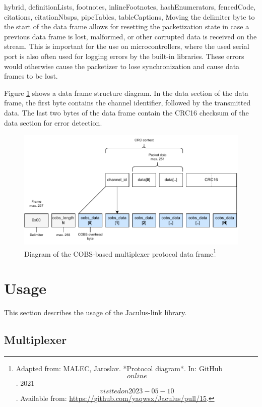 \begin{markdown*}{%
  hybrid,
  definitionLists,
  footnotes,
  inlineFootnotes,
  hashEnumerators,
  fencedCode,
  citations,
  citationNbsps,
  pipeTables,
  tableCaptions,
}
Moving the delimiter byte to the start of the data frame allows for resetting the packetization state in case a previous data frame is lost, malformed, or other corrupted data is received on the stream. This is important for the use on microcontrollers, where the used serial port is also often used for logging errors by the built-in libraries. These errors would otherwise cause the packetizer to lose synchronization and cause data frames to be lost.

Figure \ref{fig:cobs-diagram} shows a data frame structure diagram. In the data section of the data frame, the first byte contains the channel identifier, followed by the transmitted data. The last two bytes of the data frame contain the CRC16 checksum of the data section for error detection.


\begin{figure}[!ht]
    \centering
    \includegraphics[width=\textwidth]{img/cobs-diagram}
    \caption[Diagram of the COBS-based multiplexer protocol data frame]{Diagram of the COBS-based multiplexer protocol data frame\footnote{Adapted from: MALEC, Jaroslav. *Protocol diagram*. In: GitHub \[online\]. 2021 \[visited on 2023-05-10\]. Available from: \url{https://github.com/yaqwsx/Jaculus/pull/15}.}}
    \label{fig:cobs-diagram}
\end{figure}


\section{Usage} \label{sec:link-usage}

This section describes the usage of the Jaculus-link library.

\subsection{Multiplexer}


\end{markdown*}
